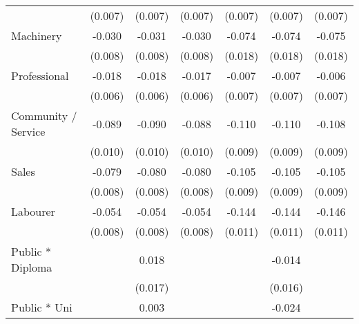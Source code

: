 {\begin{tabular}{l*{6}{c}}
                    &     (0.007)         &     (0.007)         &     (0.007)         &     (0.007)         &     (0.007)         &     (0.007)         \\
Machinery           &      -0.030\sym{***}&      -0.031\sym{***}&      -0.030\sym{***}&      -0.074\sym{***}&      -0.074\sym{***}&      -0.075\sym{***}\\
                    &     (0.008)         &     (0.008)         &     (0.008)         &     (0.018)         &     (0.018)         &     (0.018)         \\
Professional        &      -0.018\sym{***}&      -0.018\sym{***}&      -0.017\sym{***}&      -0.007         &      -0.007         &      -0.006         \\
                    &     (0.006)         &     (0.006)         &     (0.006)         &     (0.007)         &     (0.007)         &     (0.007)         \\
Community / Service &      -0.089\sym{***}&      -0.090\sym{***}&      -0.088\sym{***}&      -0.110\sym{***}&      -0.110\sym{***}&      -0.108\sym{***}\\
                    &     (0.010)         &     (0.010)         &     (0.010)         &     (0.009)         &     (0.009)         &     (0.009)         \\
Sales               &      -0.079\sym{***}&      -0.080\sym{***}&      -0.080\sym{***}&      -0.105\sym{***}&      -0.105\sym{***}&      -0.105\sym{***}\\
                    &     (0.008)         &     (0.008)         &     (0.008)         &     (0.009)         &     (0.009)         &     (0.009)         \\
Labourer            &      -0.054\sym{***}&      -0.054\sym{***}&      -0.054\sym{***}&      -0.144\sym{***}&      -0.144\sym{***}&      -0.146\sym{***}\\
                    &     (0.008)         &     (0.008)         &     (0.008)         &     (0.011)         &     (0.011)         &     (0.011)         \\
Public * Diploma    &                     &       0.018         &                     &                     &      -0.014         &                     \\
                    &                     &     (0.017)         &                     &                     &     (0.016)         &                     \\
Public * Uni        &                     &       0.003         &                     &                     &      -0.024         &                     \\

\end{tabular}}
